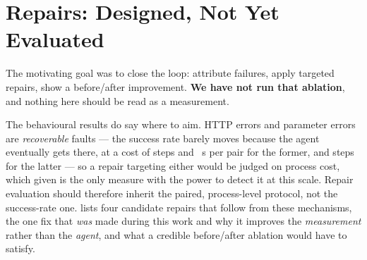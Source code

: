\section{Repairs: Designed, Not Yet Evaluated}
\label{sec:repair}

The motivating goal was to close the loop: attribute failures, apply targeted
repairs, show a before/after improvement. \textbf{We have not run that ablation},
and nothing here should be read as a measurement.

The behavioural results do say where to aim. HTTP errors and parameter errors are
\emph{recoverable} faults --- the success rate barely moves because the agent
eventually gets there, at a cost of \BehWebHttpErrorStepDelta{} steps and
\BehWebHttpErrorTimeDelta{}~s per pair for the former, and
\BehAgentParamErrorStepDelta{} steps for the latter --- so a repair targeting either
would be judged on process cost, which given  is the only
measure with the power to detect it at this scale. Repair evaluation should
therefore inherit the paired, process-level protocol, not the success-rate one.
 lists four candidate repairs that follow from these mechanisms,
the one fix that \emph{was} made during this work and why it improves the
\emph{measurement} rather than the \emph{agent}, and what a credible before/after
ablation would have to satisfy.
